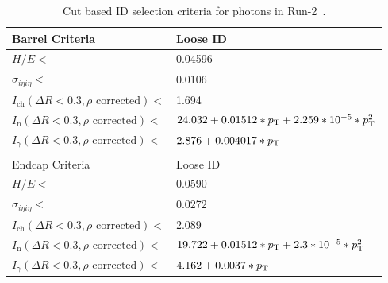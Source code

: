 \begin{table}[htb!]
	\centering
	\caption[Cut based ID selection criteria for photons in Run-2.]{Cut based ID selection criteria for photons in Run-2~\cite{photonid}.}
	\label{tab:photonID}
	\begin{tabular}{l | l}
		\hline
		Barrel Criteria & Loose ID \\
		\hline
		\hline
		$H/E<$ & 0.04596\\
		$\sigma_{i\eta i\eta}<$ & 0.0106\\
		$I_\text{ch}(\Delta R<0.3,\rho\text{ corrected})<$ & 1.694\\
		$I_\text{n}(\Delta R<0.3,\rho\text{ corrected})<$ & $24.032+0.01512*p_{\mathrm{T}}+2.259*10^{-5}*p_{\mathrm{T}}^2$\\
		$I_\gamma(\Delta R<0.3,\rho\text{ corrected})<$ & $2.876+0.004017*p_{\mathrm{T}}$\\
		\hline
		\multicolumn{2}{l}{}\\
		\hline
		Endcap Criteria & Loose ID \\
		\hline
		\hline
		$H/E<$ & 0.0590\\
		$\sigma_{i\eta i\eta}<$ & 0.0272\\
		$I_\text{ch}(\Delta R<0.3,\rho\text{ corrected})<$ & 2.089\\
		$I_\text{n}(\Delta R<0.3,\rho\text{ corrected})<$ & $19.722+0.01512*p_{\mathrm{T}}+2.3*10^{-5}*p_{\mathrm{T}}^2$\\
		$I_\gamma(\Delta R<0.3,\rho\text{ corrected})<$ & $4.162+0.0037*p_{\mathrm{T}}$\\
		\hline
	\end{tabular}
\end{table}

